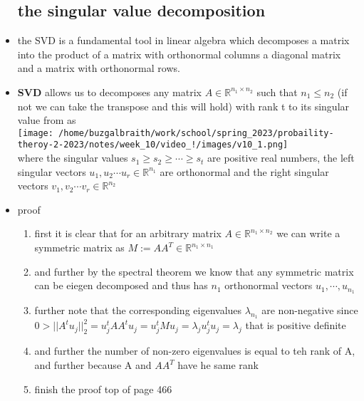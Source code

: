 \documentclass{article}
\begin{document}
\begin{itemize}
\subsection*{the singular value decomposition }
\item the SVD is a fundamental tool in linear algebra which decomposes a matrix into the product of a matrix with orthonormal columns
a diagonal matrix and a matrix with orthonormal rows. 
\item \textbf{SVD} allows us to decomposes any matrix $A\in \mathbb{R}^{n_1\times n_2}$ such that $n_1\leq n_2$ (if not we can 
take the transpose and this will hold) with rank t to its singular value from as \\
\texttt{[image: /home/buzgalbraith/work/school/spring\_2023/probaility-theroy-2-2023/notes/week\_10/video\_!/images/v10\_1.png]}
\\ where  the singular values $s_1\geq s_2 \geq \cdots \geq s_t$ are positive real numbers, the left singular vectors
$u_1,u_2\cdots u_r\in \mathbb{R}^{n_1}$ are orthonormal and the right singular vectors $v_1,v_2\cdots v_r\in \mathbb{R}^{n_2}$

\item proof
\begin{enumerate}
    \item first it is clear that for an arbitrary matrix $A\in \mathbb{R}^{n_1\times n_2}$ we can write a symmetric matrix as $M:=AA^{T}\in \mathbb{R}^{n_1\times n_1}$
    \item and further by the spectral theorem we know that any symmetric matrix can be eiegen decomposed and thus has $n_1$ orthonormal vectors $u_1,\cdots , u_{n_1}$
    \item further note that the corresponding eigenvalues $\lambda_{n_1}$ are non-negative since $0> ||A^{t}u_{j}||_{2}^{2}=u_{j}^{t}AA^{t}u_{j}=u_{j}^{t}Mu_{j}=\lambda_{j}u_{j}^{t}u_{j}=\lambda_{j}$ that is positive definite
    \item and further the number of non-zero eigenvalues is equal to teh rank of A, and further because A and $AA^{T}$ have he same rank  
    \item finish the proof top of page 466
\end{enumerate}
\end{itemize}
\end{document}
